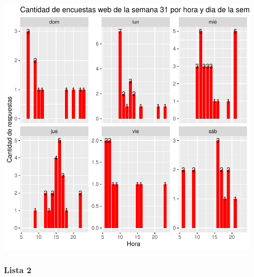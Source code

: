 \documentclass{article}
\begin{document}
\includegraphics{seguimientov5-018}

\subsubsection{Lista 2}
\end{document}
